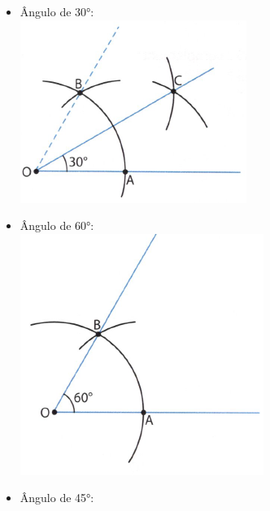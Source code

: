 \documentclass[a4paper,14pt]{article}
\begin{document}
\begin{multicols}{2}
\begin{itemize}
			\item Ângulo de 30°: \\
			\includegraphics[width=1\linewidth]{6FMA87_imagens/imagem2}
			\item Ângulo de 60°: \\
			\includegraphics[width=1\linewidth]{6FMA87_imagens/imagem3}
			\item Ângulo de 45°: \\

\end{itemize}
\end{multicols}
\end{document}

